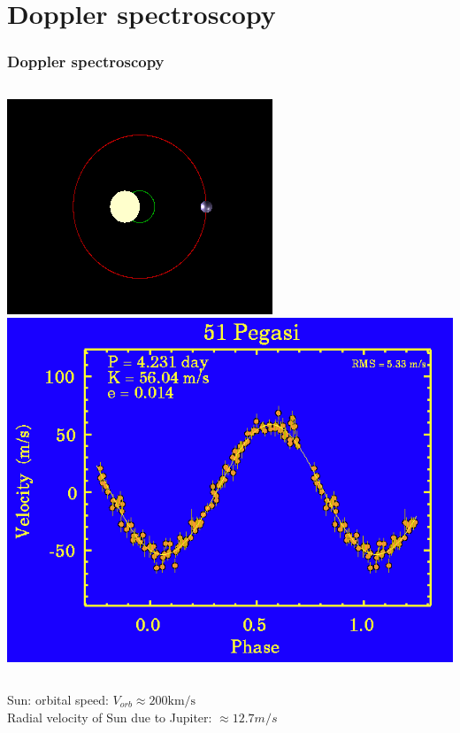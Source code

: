 \documentclass{beamer}
\begin{document}
\section{Doppler spectroscopy}
\begin{frame}
\frametitle{Doppler spectroscopy}

\begin{columns}
\includegraphics[width=\textwidth]{img/Dopplerspectr-above.png}
\includegraphics[width=\textwidth]{img/51Pegasi.png}
\end{columns}

Sun: orbital speed: $V_{orb} \approx 200 \mathrm{km/s}$ \\
Radial velocity of Sun due to Jupiter: $\approx 12.7 m/s$ \\


\end{frame}
\end{document}
